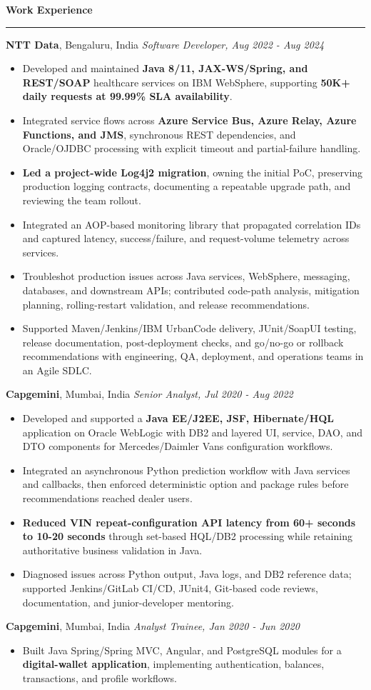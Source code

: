 \documentclass[11pt,letterpaper]{article}
\newcommand{\ressection}[1]{\Needspace{6\baselineskip}\vspace{8pt}\par\textbf{#1}\par\vspace{2pt}\hrule\vspace{5pt}}
\begin{document}
\ressection{Work Experience}
\textbf{NTT Data}, Bengaluru, India \hfill \textit{Software Developer, Aug 2022 - Aug 2024}
\begin{itemize}
  \item Developed and maintained \textbf{Java 8/11, JAX-WS/Spring, and REST/SOAP} healthcare services on IBM WebSphere, supporting \textbf{50K+ daily requests at 99.99\% SLA availability}.
  \item Integrated service flows across \textbf{Azure Service Bus, Azure Relay, Azure Functions, and JMS}, synchronous REST dependencies, and Oracle/OJDBC processing with explicit timeout and partial-failure handling.
  \item \textbf{Led a project-wide Log4j2 migration}, owning the initial PoC, preserving production logging contracts, documenting a repeatable upgrade path, and reviewing the team rollout.
  \item Integrated an AOP-based monitoring library that propagated correlation IDs and captured latency, success/failure, and request-volume telemetry across services.
  \item Troubleshot production issues across Java services, WebSphere, messaging, databases, and downstream APIs; contributed code-path analysis, mitigation planning, rolling-restart validation, and release recommendations.
  \item Supported Maven/Jenkins/IBM UrbanCode delivery, JUnit/SoapUI testing, release documentation, post-deployment checks, and go/no-go or rollback recommendations with engineering, QA, deployment, and operations teams in an Agile SDLC.
\end{itemize}
\textbf{Capgemini}, Mumbai, India \hfill \textit{Senior Analyst, Jul 2020 - Aug 2022}
\begin{itemize}
  \item Developed and supported a \textbf{Java EE/J2EE, JSF, Hibernate/HQL} application on Oracle WebLogic with DB2 and layered UI, service, DAO, and DTO components for Mercedes/Daimler Vans configuration workflows.
  \item Integrated an asynchronous Python prediction workflow with Java services and callbacks, then enforced deterministic option and package rules before recommendations reached dealer users.
  \item \textbf{Reduced VIN repeat-configuration API latency from 60+ seconds to 10-20 seconds} through set-based HQL/DB2 processing while retaining authoritative business validation in Java.
  \item Diagnosed issues across Python output, Java logs, and DB2 reference data; supported Jenkins/GitLab CI/CD, JUnit4, Git-based code reviews, documentation, and junior-developer mentoring.
\end{itemize}
\textbf{Capgemini}, Mumbai, India \hfill \textit{Analyst Trainee, Jan 2020 - Jun 2020}
\begin{itemize}
  \item Built Java Spring/Spring MVC, Angular, and PostgreSQL modules for a \textbf{digital-wallet application}, implementing authentication, balances, transactions, and profile workflows.
\end{itemize}
\end{document}
